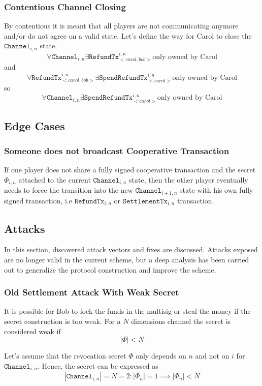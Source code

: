 \documentclass{llncs}
\begin{document}
\subsubsection{Contentious Channel Closing} By contentious it is meant that all
players are not communicating anymore and/or do not agree on a valid state.
Let's define the way for Carol to close the $\texttt{Channel}_{i,n}$ state.
\[ \forall \texttt{Channel}_{i,n} \exists \texttt{RefundTx}_{<carol,bob>}^{i,n}
\text{only owned by Carol}
\] and
\[ \forall \texttt{RefundTx}_{<carol,bob>}^{i,n} \exists
\texttt{SpendRefundTx}_{<carol>}^{i,n} \text{only owned by Carol}
\] so
\[ \forall \texttt{Channel}_{i,n} \exists
\texttt{SpendRefundTx}_{<carol>}^{i,n} \text{only owned by Carol}
\]

\subsection{Edge Cases}

\subsubsection{Someone does not broadcast Cooperative Transaction} If one player
does not share a fully signed cooperative transaction and the secret
$\Phi_{i,n}$ attached to the current $\texttt{Channel}_{i,n}$ state, then the
other player eventually needs to force the transition into the new
$\texttt{Channel}_{i+1,n}$ state with his own fully signed transaction, i.e
$\texttt{RefundTx}_{i,n}$ or $\texttt{SettlementTx}_{i,n}$ transaction.

\subsection{Attacks} In this section, discovered attack vectors and fixes are
discussed. Attacks exposed are no longer valid in the current scheme, but a deep
analysis has been carried out to generalize the protocol construction and
improve the scheme.

\subsubsection{Old Settlement Attack With Weak Secret}
\label{sssec:oldSettlementAttack} It is possible for Bob to lock the funds in
the multisig or steal the money if the secret construction is too weak. For a
$N$ dimensions channel the secret is considered weak if
\[ |\Phi| < N
\]

Let's assume that the revocation secret $\Phi$ only depends on $n$ and not on
$i$ for $\texttt{Channel}_{i,n}$. Hence, the secret can be expressed as
\[ |\texttt{Channel}_{i,n}| = N = 2 : |\Phi_n| = 1 \implies |\Phi_n| < N
\]
\end{document}
